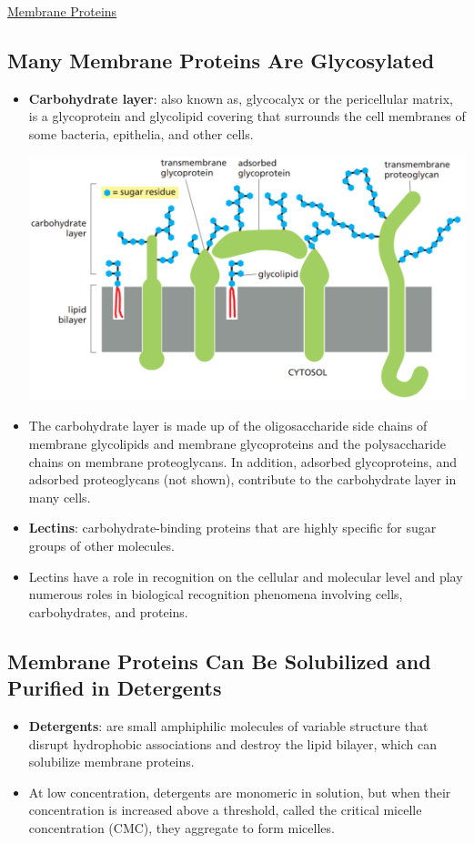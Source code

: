 \documentclass[12pt,letterpaper]{article}
\begin{document}
\begin{secbox}{\hyperlink{10}{Membrane Proteins}}
{    \subsection*{Many Membrane Proteins Are Glycosylated}
    \begin{itemize}
        \item \textbf{Carbohydrate layer}: also known as, glycocalyx or the pericellular matrix, is a glycoprotein and glycolipid covering that surrounds the cell membranes of some bacteria, epithelia, and other cells.
        \begin{center}
            \includegraphics[scale=0.30]{images/figure_10_25.png}
        \end{center}
        \vspace{-20pt}
        \item The carbohydrate layer is made up of the oligosaccharide side chains of membrane glycolipids and membrane glycoproteins and the polysaccharide chains on membrane proteoglycans. In addition, adsorbed glycoproteins, and adsorbed proteoglycans (not shown), contribute to the carbohydrate layer in many cells.
        \item \textbf{Lectins}: carbohydrate-binding proteins that are highly specific for sugar groups of other molecules.\par 
        \item Lectins have a role in recognition on the cellular and molecular level and play numerous roles in biological recognition phenomena involving cells, carbohydrates, and proteins. 
    \end{itemize}

    \subsection*{Membrane Proteins Can Be Solubilized and Purified in Detergents}
    \begin{itemize}
        \item \textbf{Detergents}: are small amphiphilic molecules of variable structure that disrupt hydrophobic associations and destroy the lipid bilayer, which can solubilize membrane proteins.
        \item At low concentration, detergents are monomeric in solution, but when their concentration is increased above a threshold, called the critical micelle concentration (CMC), they aggregate to form micelles.
    \end{itemize}

}
\end{secbox}
\end{document}
